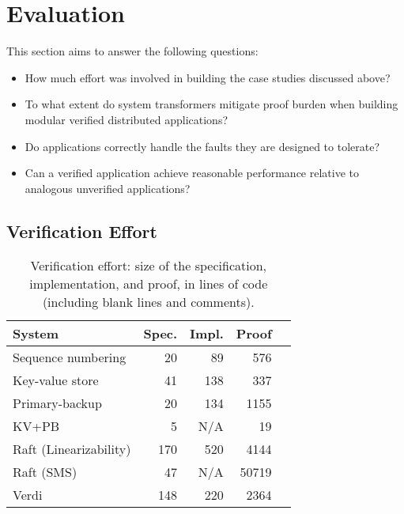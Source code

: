 \section{Evaluation}
\label{sec:verdi:eval}

This section aims to answer the following questions:
\begin{itemize}%
\item How much effort was involved in building the case studies discussed above?
\item To what extent do system transformers mitigate proof burden when
  building modular verified distributed applications?
\item Do \Verdi applications correctly handle the faults they are designed to tolerate?
\item Can a verified \Verdi application achieve reasonable performance
  relative to analogous unverified applications?
\end{itemize}

\subsection{Verification Effort}
\begin{table}[t]
  \centering
  \caption{Verification effort:  size of the specification, implementation,
    and proof, in lines of code (including blank lines and comments).}\vspace{6pt}
\label{tab:effort}
  \begin{tabular}{lrrrr}
\toprule
\textbf{System}        & \textbf{Spec.} & \textbf{Impl.} & \textbf{Proof}\\\midrule
Sequence numbering     &  20            & 89             & 576       \\
Key-value store        &  41            & 138            & 337       \\
Primary-backup         &  20            & 134            & 1155      \\
KV+PB                  &  5             & N/A            & 19        \\
Raft (Linearizability) &  170           & 520            & 4144      \\
Raft (SMS)             &  47            & N/A            & 50719     \\
Verdi                  &  148           & 220            & 2364      \\
\bottomrule
  \end{tabular}
\end{table}

